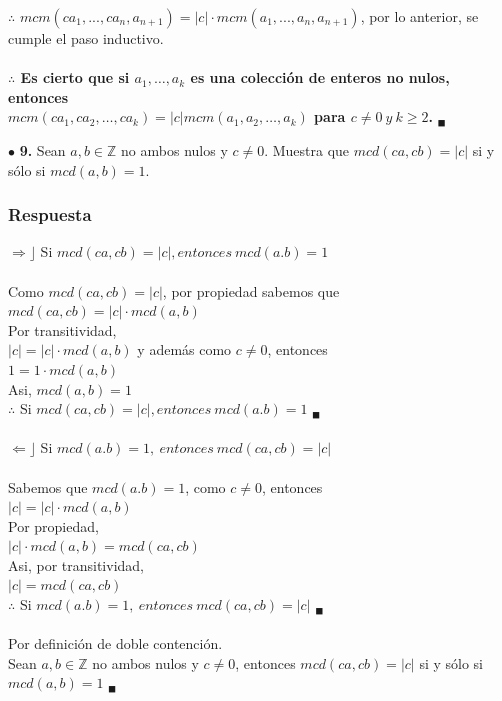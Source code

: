 \documentclass[12pt]{article}
\begin{document}
	$\therefore$  $mcm(ca_1, ..., ca_n,a_{n+1}) = |c| \cdot mcm(a_1, ..., a_n, a_{n+1})$, por lo anterior, se cumple el paso inductivo.\\
	\\
	\textbf{$\therefore$ Es cierto que si $a_1, \dots, a_k$ es una colección de enteros no nulos, entonces\\
		$mcm(ca_1, ca_2, \dots, ca_k ) = |c|mcm(a_1, a_2, \dots, a_k )$ para $c \neq 0 \ y \ k \geq 2$.} $_\blacksquare$
	
	\vspace{1cm}
	
	$\bullet$ \textbf{9.} Sean $a, b \in \mathbb{Z}$ no ambos nulos y $c \neq 0$. Muestra que $mcd(ca, cb) = |c|$ si y sólo si $mcd(a, b) = 1$.
	
	\subsubsection*{Respuesta}
	$\Rightarrow \rfloor$ Si $mcd(ca,cb) = |c|, entonces \ mcd(a.b)=1$\\
	\\
	Como $mcd(ca,cb) = |c|$, por propiedad sabemos que\\
	$mcd(ca,cb)= |c| \cdot mcd(a,b)$\\
	Por transitividad,\\
	$|c| = |c| \cdot mcd(a,b)$ y además como $c \neq 0$, entonces\\
	$1 = 1 \cdot mcd(a,b)$\\
	Asi, $mcd(a,b) = 1$ \\
	$\therefore$ Si $mcd(ca,cb) = |c|, entonces \ mcd(a.b)=1$ $_\blacksquare$\\
	\\
	$\Leftarrow \rfloor$ Si $ mcd(a.b)=1, \ entonces \ mcd(ca,cb) = |c|$\\
	\\
	Sabemos que  $ mcd(a.b)=1$, como $c \neq 0$, entonces \\
	$|c| = |c| \cdot mcd(a,b)$\\
	Por propiedad, \\
	$|c| \cdot mcd(a,b) = mcd(ca,cb) $\\
	Asi, por transitividad,\\
	$|c| = mcd(ca,cb)$\\
	$\therefore$ Si $ mcd(a.b)=1, \ entonces \ mcd(ca,cb) = |c|$ $_\blacksquare$\\
	\\
	Por definición de doble contención.\\
	Sean $a, b \in \mathbb{Z}$ no ambos nulos y $c \neq 0$, entonces $mcd(ca, cb) = |c|$ si y sólo si $mcd(a, b) = 1$ $_\blacksquare$
	\vspace{1cm}
	
\end{document}
